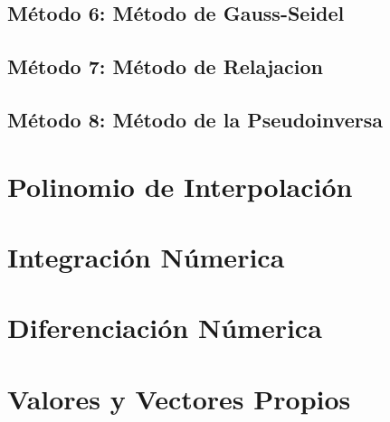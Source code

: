\documentclass[10pt,a4paper]{article}
\begin{document}
	\subsection{Método 6: Método de Gauss-Seidel}
	
	
					
	\subsection{Método 7: Método de Relajacion}

	
							
	\subsection{Método 8: Método de la Pseudoinversa}
	
	
	
	\section{Polinomio de Interpolación}
	
	\section{Integración Númerica}
	
	\section{Diferenciación Númerica}
	
	\section{Valores y Vectores Propios}
	
\end{document}
